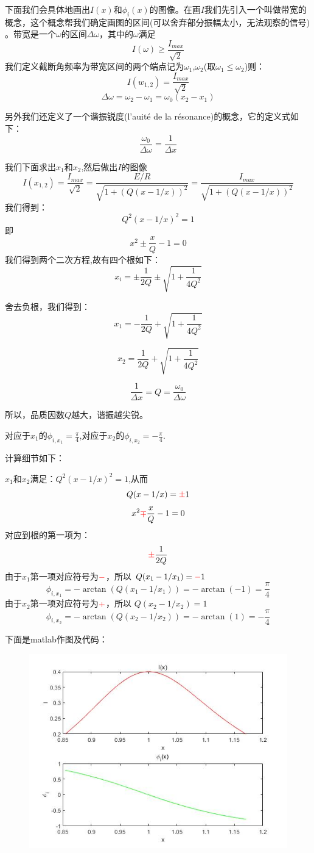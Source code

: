 \documentclass[12pt]{book}
\theoremstyle{definition}\newtheorem{dfn}{Définition}[chapter]
\theoremstyle{plain}\newtheorem{thm}{Théorème}[chapter]
\theoremstyle{plain}\newtheorem{prp}{Proposition}[chapter]
\theoremstyle{plain}\newtheorem{lem}{\bf Lemme}[chapter]
\theoremstyle{plain}\newtheorem{axm}{\bf Axiome}[chapter]
\theoremstyle{plain}\newtheorem{lmm}{\bf Lemme}[chapter]
\theoremstyle{plain}\newtheorem{cor}{\bf Corollaire}[chapter]
\theoremstyle{remark}\newtheorem{rem}{Remarque}[chapter]
\begin{document}
下面我们会具体地画出$I(x)$和$\phi_{i}(x)$的图像。在画$I$我们先引入一个叫做{\color{red}带宽}的概念，这个概念帮我们确定画图的区间(可以舍弃部分振幅太小，无法观察的信号)
。带宽是一个$\omega$的区间$\Delta\omega$，其中的$\omega$满足
$$
I(\omega)\ge\frac{I_{max}}{\sqrt{2}} 
$$
我们定义截断角频率为带宽区间的两个端点记为$\omega_1$,$\omega_2$(取$\omega_1\le\omega_2$)则：
$$
I(w_{1,2})=\frac{I_{max}}{\sqrt{2}} 
$$
$$
\Delta\omega=\omega_2-\omega_1=\omega_0(x_2-x_1)
$$

另外我们还定义了一个{\color{red}谐振锐度(l'auité de la résonance)}的概念，它的定义式如下：
$$
\frac{\omega_0}{\Delta\omega}=\frac{1}{\Delta x}
$$

我们下面求出$x_1$和$x_2$,然后做出$I$的图像
$$
I(x_{1,2})=\frac{I_{max}}{\sqrt{2}} =\frac{E/R}{\sqrt{1+(Q(x-1/x))^2}}
=\frac{I_{max}}{\sqrt{1+(Q(x-1/x))^2}}
$$
我们得到：
$$
Q^2(x-1/x)^2=1
$$
即
$$
x^2\pm\frac{x}{Q}-1=0
$$
我们得到两个二次方程,故有四个根如下：
$$
x_i=\pm\frac{1}{2Q}\pm\sqrt{1+\frac{1}{4Q^2}}
$$

舍去负根，我们得到：
$$
x_1=-\frac{1}{2Q}+\sqrt{1+\frac{1}{4Q^2}}
$$

$$
x_2=\frac{1}{2Q}+\sqrt{1+\frac{1}{4Q^2}}
$$

$$
\frac{1}{\Delta x}=Q=\frac{\omega_0}{\Delta\omega}
$$

所以，品质因数$Q$越大，谐振越尖锐。

对应于$x_1$的$\phi_{i,x_1}=\frac{\pi}{4}$,对应于$x_2$的$\phi_{i,x_2}=-\frac{\pi}{4}$.

计算细节如下：

$x_1$和$x_2$满足：$Q^2(x-1/x)^2=1$,从而
$$
Q(x-1/x)={\color{red}\pm}1
$$
$$
x^2{\color{red}\mp}\frac{x}{Q}-1=0
$$
对应到根的第一项为：
$$
{\color{red}\pm}\frac{1}{2Q}
$$
由于$x_1$第一项对应符号为${\color{red}-}$，所以
$Q(x_1-1/x_1)={\color{red}-}1$
$$
\phi_{i,x_1}=-\arctan(Q(x_1-1/x_1))=-\arctan(-1)=\frac{\pi}{4}
$$
由于$x_2$第一项对应符号为${\color{red}+}$，所以
$Q(x_2-1/x_2)=1$
$$
\phi_{i,x_2}=-\arctan(Q(x_2-1/x_2))=-\arctan(1)=-\frac{\pi}{4}
$$

下面是matlab作图及代码：
\begin{figure}[H]
	\centering
	\includegraphics[scale=0.7]{image//Etude du circuit RLC serie-Resonances//6}
\end{figure}
\end{document}
